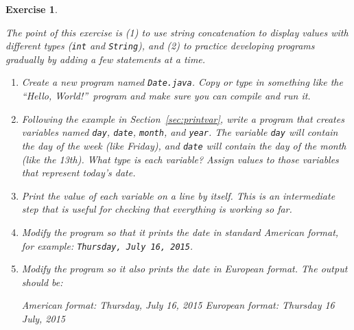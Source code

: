 \documentclass[12pt]{book}
\theoremstyle{exercise}
\newtheorem{exercise}{Exercise}[chapter]
\newcommand{\java}[1]{\verb"#1"}
\newcommand{\java}[1]{\lstinline{#1}} %
\begin{document}
\begin{exercise}
\label{ex:date}

The point of this exercise is (1) to use string concatenation to display values with different types (\java{int} and \java{String}), and (2) to practice developing programs gradually by adding a few statements at a time.

\begin{enumerate}

\item Create a new program named {\tt Date.java}.
Copy or type in something like the ``Hello, World!''\ program and make sure you can compile and run it.

\item Following the example in Section~\ref{sec:printvar}, write a program that creates variables named \java{day}, \java{date}, \java{month}, and \java{year}.
The variable \java{day} will contain the day of the week (like Friday), and \java{date} will contain the day of the month (like the 13th).
What type is each variable?
Assign values to those variables that represent today's date.

\item Print the value of each variable on a line by itself.
This is an intermediate step that is useful for checking that everything is working so far.

\item Modify the program so that it prints the date in standard American format, for example: {\tt Thursday, July 16, 2015}.

\item Modify the program so it also prints the date in European format.
The output should be:

\begin{stdout}
American format:
Thursday, July 16, 2015
European format:
Thursday 16 July, 2015
\end{stdout}

\end{enumerate}

\end{exercise}
\end{document}
